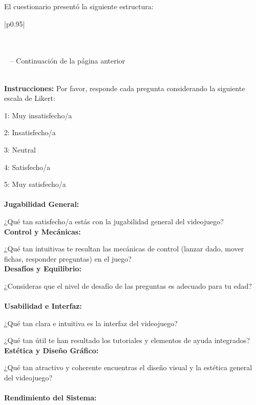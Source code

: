 El cuestionario presentó la siguiente estructura:

\begin{longtable}{|p{}|}
\caption{Cuestionario de Satisfacción del Usuario -- Go Goals! Digital (elaboración propia).\label{tab:cuestionario_satisfaccion}} \\
\hline
{} \\
\hline
\endfirsthead
{}
{{ \tablename\ \thetable{} -- Continuación de la página anterior}} \\
\hline
{} \\
\hline
\endhead
\hline
\endfoot
\endlastfoot

\textbf{Instrucciones:} Por favor, responde cada pregunta considerando la siguiente escala de Likert:

1: Muy insatisfecho/a

2: Insatisfecho/a

3: Neutral

4: Satisfecho/a

5: Muy satisfecho/a \\
\hline
{} \\
\hline
\textbf{Jugabilidad General:}

¿Qué tan satisfecho/a estás con la jugabilidad general del videojuego? \\
\hline
\textbf{Control y Mecánicas:}

¿Qué tan intuitivas te resultan las mecánicas de control (lanzar dado, mover fichas, responder preguntas) en el juego? \\
\hline
\textbf{Desafíos y Equilibrio:}

¿Consideras que el nivel de desafío de las preguntas es adecuado para tu edad? \\
\hline
{} \\
\hline
\textbf{Usabilidad e Interfaz:}

¿Qué tan clara e intuitiva es la interfaz del videojuego?

¿Qué tan útil te han resultado los tutoriales y elementos de ayuda integrados? \\
\hline
\textbf{Estética y Diseño Gráfico:}

¿Qué tan atractivo y coherente encuentras el diseño visual y la estética general del videojuego? \\
\hline
{} \\
\hline
\textbf{Rendimiento del Sistema:}


\end{longtable}
